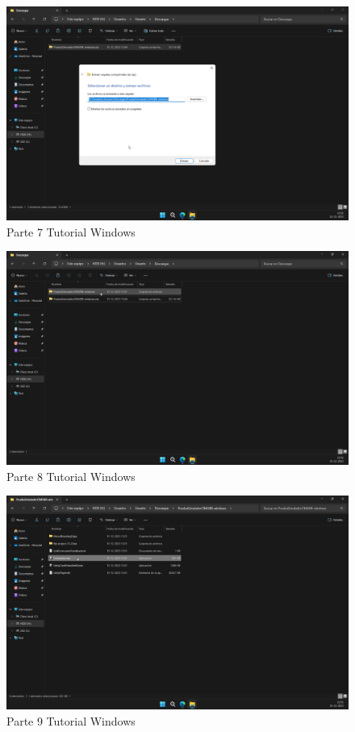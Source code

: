 \begin{figure}[ht]
    \centering
    \includegraphics[width=13cm]{figures/TutorialWindows/tutorial (7).png}
    \caption{Parte 7 Tutorial Windows}
    \label{fig:tutowin7}
\end{figure}

\begin{figure}[ht]
    \centering
    \includegraphics[width=13cm]{figures/TutorialWindows/tutorial (8).png}
    \caption{Parte 8 Tutorial Windows}
    \label{fig:tutowin8}
\end{figure}

\begin{figure}[ht]
    \centering
    \includegraphics[width=13cm]{figures/TutorialWindows/tutorial (9).png}
    \caption{Parte 9 Tutorial Windows}
    \label{fig:tutowin9}
\end{figure}


